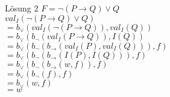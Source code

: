 \begin{frame}{Lösung 2}
	$F=\neg(P\rightarrow Q)\vee Q$\\
	$val_{I}(\neg(P\rightarrow Q)\vee Q)$\\
	\pause
	$=b_{\vee}(val_{I}(\neg(P\rightarrow Q)), val_{I}(Q))$\\
	\pause
	$=b_{\vee}(b_{\neg}(val_{I}(P\rightarrow Q)), I(Q))$\\
	\pause
	$=b_{\vee}(b_{\neg}(b_{\rightarrow}(val_{I}(P), val_{I}(Q))), f)$\\
	\pause
	$=b_{\vee}(b_{\neg}(b_{\rightarrow}(I(P), I(Q))), f)$\\
	\pause
	$=b_{\vee}(b_{\neg}(b_{\rightarrow}(w, f)), f)$\\
	\pause
	$=b_{\vee}(b_{\neg}(f), f)$\\
	\pause
	$=b_{\vee}(w, f)$\\
	\pause
	$=w$\\
\end{frame}
